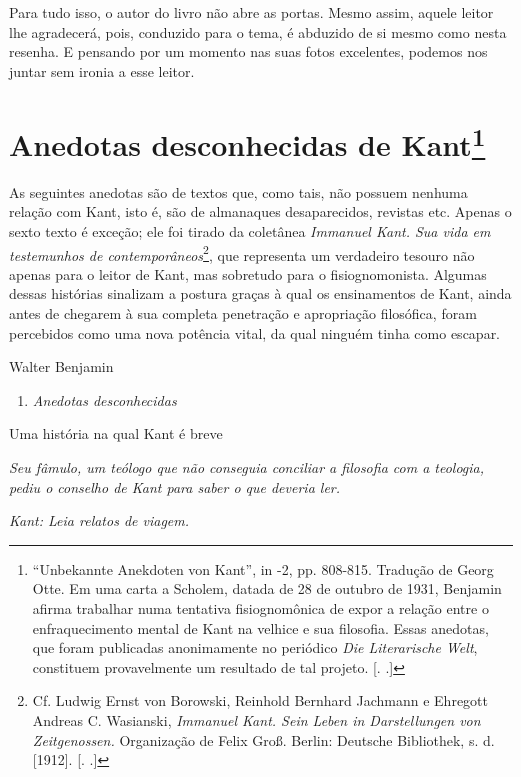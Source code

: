 Para tudo isso, o autor do livro não abre as portas. Mesmo assim, aquele
leitor lhe agradecerá, pois, conduzido para o tema, é abduzido de si
mesmo como nesta resenha. E pensando por um momento nas suas fotos
excelentes, podemos nos juntar sem ironia a esse leitor.

\chapter{Anedotas desconhecidas de Kant\footnote[*]{``Unbekannte Anekdoten von
  Kant'', in  -2, pp. 808-815. Tradução de Georg Otte. Em uma carta
  a Scholem, datada de 28 de outubro de 1931, Benjamin afirma trabalhar
  numa tentativa fisiognomônica de expor a relação entre o
  enfraquecimento mental de Kant na velhice e sua filosofia. Essas
  anedotas, que foram publicadas anonimamente no periódico \emph{Die
  Literarische Welt}, constituem provavelmente um resultado de tal
  projeto. [. .]}}

As seguintes anedotas são de textos que, como tais, não possuem nenhuma
relação com Kant, isto é, são de almanaques desaparecidos, revistas etc.
Apenas o sexto texto é exceção; ele foi tirado da coletânea
\emph{Immanuel Kant. Sua vida em testemunhos de
contemporâneos}\footnote{Cf. Ludwig Ernst von Borowski, Reinhold
  Bernhard Jachmann e Ehregott Andreas C. Wasianski, \emph{Immanuel
  Kant. Sein Leben in Darstellungen von Zeitgenossen.} Organização de
  Felix Groß. Berlin: Deutsche Bibliothek, s. d. [1912]. [. .]}, que representa um verdadeiro tesouro não apenas para o
leitor de Kant, mas sobretudo para o fisiognomonista. Algumas dessas
histórias sinalizam a postura graças à qual os ensinamentos de Kant,
ainda antes de chegarem à sua completa penetração e apropriação
filosófica, foram percebidos como uma nova potência vital, da qual
ninguém tinha como escapar.

Walter Benjamin

\begin{enumerate}
\def\labelenumi{\Roman{enumi}.}
\item
  \emph{Anedotas desconhecidas}
\end{enumerate}

Uma história na qual Kant é breve

\emph{Seu fâmulo, um teólogo que não conseguia conciliar a filosofia com
a teologia, pediu o conselho de Kant para saber o que deveria ler.}

\emph{Kant: Leia relatos de viagem.}


